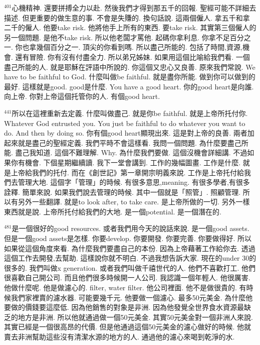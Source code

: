 \documentclass{book}
\begin{document}
$^{401}$心機精神.
還要拼搏全力以赴.
然後我們才得到那五千的回報.
聖經可能不詳細去描述.
但更重要的做生意的事.
不會是失賺的.
換句話說.
這兩個僱人.
拿五千和拿二千的僱人.
他要take risk.
他將他手上所有的東西.
要take risk.
其實第三個僱人的另一個問題.
是他不take risk.
所以他老闆才罵他.
起碼你拿利息.
你拿不足百分之一.
你也拿幾個百分之一.
頂尖的你看到嗎.
所以盡己所能的.
包括了時間,資源,機會.
還有冒險.
你有沒有付盡全力.
所以弟兄姊妹.
如果用這個比喻給我們看.
一個盡己所能的人.
就是耶穌在評語中所說的.
你這個又忠心又良善.
原來我們常說.
We have to be faithful to God.
什麼叫做be faithful.
就是盡你所能.
做到你可以做到的最好.
這樣就是good.
good是什麼.
You have a good heart.
你的good heart是向誰.
向上帝.
你對上帝這個托管你的人.
有個good heart.

$^{441}$所以在這裡重新去定義.
什麼叫做盡己.
就是你be faithful.
就是上帝所托付你.
Whatever God entrusted you.
You just be faithful to do whatever you want to do.
And then by doing so.
你有個good heart顯現出來.
這是對上帝的良善.
兩者加起來就是盡己的聖經定義.
我們平時不會這樣看.
我問一個問題.
為什麼要盡己所能.
盡己我知道.
這個不難理解.
Why.
為什麼我們要做.
這個沒機會詳細講.
不過如果你有機會.
下個星期繼續讀.
我下一堂會講到.
工作的幾幅圖畫.
工作是什麼.
就是上帝給我們的托付.
而在《創世記》第一章開宗明義來說.
工作是上帝托付給我們去管理大地.
這個字「管理」的時候.
有很多意思,meaning.
有很多學者,有很多詮釋.
簡單來說.
如果我們說去管理的時候.
其中一個就是「照管」.
照顧管理.
所以有另外一些翻譯.
就是to look after, to take care.
是上帝所做的一切.
另外一樣東西就是說.
上帝所托付給我們的大地.
是一個potential.
是一個潛在的.

$^{481}$是一個很好的good resources.
或者我們用今天的說話來說.
是一個good assets.
但是一個good assets是怎樣.
你要develop.
你要開發.
你要完善.
你要做得好.
所以如果從這個角度來看.
為什麼我們要盡自己的本份.
因為上帝藉著工作給你去.
透過這個工作去開發,去幫助.
這樣說你就不明白.
不過我想告訴大家.
現在的under 30的很多的.
我們叫做x generation.
或者我們叫做千禧世代的人.
他們不喜歡打工.
他們很喜歡自己開公司.
而且他們很多時候開一人公司.
我認識一個年輕人.
他很厲害.
他做什麼呢.
他是做濾心的.
filter, water filter.
他公司裡面.
他不是做很貴的.
有時候我們家裡賣的濾水器.
可能要幾千元.
他要做一個濾心.
最多50元美金.
為什麼他要做的價錢要這麼低.
因為他銷售的對象是非洲.
因為他發覺全世界食水資源最缺乏的地方是非洲.
所以他就通過做一個50元美金.
其實50元美金對一個非洲人來說.
其實已經是一個很高昂的代價.
但是他通過這個50元美金的濾心做好的時候.
他就賣去非洲幫助這些沒有清潔水源的地方的人.
通過他的濾心來喝到乾淨的水.
\end{document}
